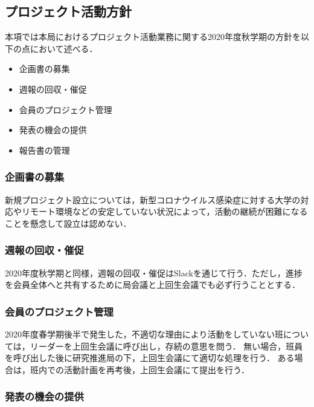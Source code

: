 \subsection*{プロジェクト活動方針}


本項では本局におけるプロジェクト活動業務に関する2020年度秋学期の方針を以下の点において述べる．

\begin{itemize}
\item 企画書の募集
\item 週報の回収・催促
\item 会員のプロジェクト管理
\item 発表の機会の提供
\item 報告書の管理
\end{itemize}

\subsubsection*{企画書の募集}

新規プロジェクト設立については，新型コロナウイルス感染症に対する大学の対応やリモート環境などの安定していない状況によって，活動の継続が困難になることを懸念して設立は認めない．

\subsubsection*{週報の回収・催促}

2020年度秋学期と同様，週報の回収・催促はSlackを通じて行う．ただし，進捗を会員全体へと共有するために局会議と上回生会議でも必ず行うこととする．

\subsubsection*{会員のプロジェクト管理}

2020年度春学期後半で発生した，不適切な理由により活動をしていない班については，リーダーを上回生会議に呼び出し，存続の意思を問う．
無い場合，班員を呼び出した後に研究推進局の下，上回生会議にて適切な処理を行う．
ある場合は，班内での活動計画を再考後，上回生会議にて提出を行う．

\subsubsection* {発表の機会の提供}

